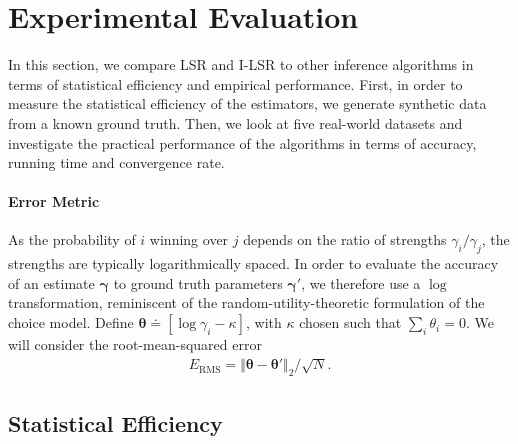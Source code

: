 \section{Experimental Evaluation}
\label{fi:sec:experiments}

In this section, we compare LSR and I-LSR to other inference algorithms in terms of statistical efficiency and empirical performance.
First, in order to measure the statistical efficiency of the estimators, we generate synthetic data from a known ground truth.
Then, we look at five real-world datasets and investigate the practical performance of the algorithms in terms of accuracy, running time and convergence rate.

\paragraph{Error Metric}
As the probability of $i$ winning over $j$ depends on the ratio of strengths $\gamma_i / \gamma_j$, the strengths are typically logarithmically spaced.
In order to evaluate the accuracy of an estimate $\bm{\gamma}$ to ground truth parameters $\bm{\gamma}'$, we therefore use a $\log$ transformation, reminiscent of the random-utility-theoretic formulation of the choice model.
Define $\bm{\theta} \doteq [\log \gamma_i - \kappa]$, with $\kappa$ chosen such that $\sum_i \theta_i = 0$.
We will consider the root-mean-squared error
\begin{align*}
E_{\text{RMS}} = \Vert \bm{\theta} - \bm{\theta}' \Vert_2 / \sqrt{N}.
\end{align*}

\subsection{Statistical Efficiency}

